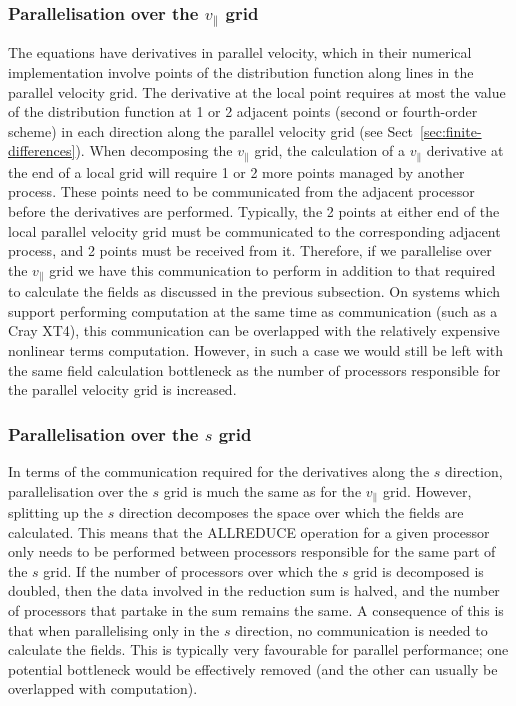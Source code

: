 \subsubsection{Parallelisation over the $v_\parallel$ grid}

The equations have derivatives in parallel velocity, which in their numerical implementation involve points of the
distribution function along lines in the parallel velocity grid. The derivative at the local point requires at most
the value of the distribution function at 1 or 2 adjacent points (second or fourth-order scheme) in each direction along the parallel
velocity grid (see Sect~\ref{sec:finite-differences}). When decomposing the $v_\parallel$ grid, the calculation of a
$v_\parallel$ derivative at the end of a local grid will require 1 or 2 more points managed by another process.
These points need to be communicated from the
adjacent processor before the derivatives are performed. Typically, the 2 points at either end of the local parallel velocity
grid must be communicated to the corresponding adjacent process, and 2 points must be received from it.
Therefore, if we parallelise over the $v_\parallel$ grid we have this communication to perform in addition to that required
to calculate the fields as discussed in the previous subsection. On systems which support performing computation at the same
time as communication (such as a Cray XT4), this communication can be overlapped with the relatively
expensive nonlinear terms computation. However, in such a case we would still be left with the same field calculation
bottleneck as the number of processors responsible for the parallel velocity grid is increased. 

\subsubsection{Parallelisation over the $s$ grid}

In terms of the communication required for the derivatives along the $s$ direction, parallelisation over the $s$ grid is much
the same as for the $v_\parallel$ grid. However, splitting up the $s$ direction decomposes the space over which the fields
are calculated. This means that the ALLREDUCE operation for a given processor only needs to be performed between processors
responsible for the same part of the $s$ grid. If the number of processors over which the $s$ grid is decomposed is doubled,
then the data involved in the reduction sum is halved, and the number of processors that partake in the sum remains the same.
A consequence of this is that when parallelising only in the $s$ direction, no communication is needed to calculate
the fields. This is typically very favourable for parallel performance; one potential bottleneck would be effectively
removed (and the other can usually be overlapped with computation).

